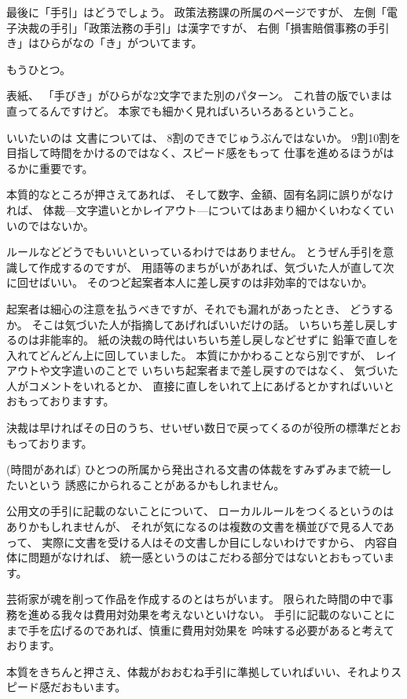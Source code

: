 \documentclass[uplatex,jis2004,dvipdfmx,12pt]{jsarticle}
\begin{document}
最後に「手引」はどうでしょう。
政策法務課の所属のページですが、
左側「電子決裁の手引」「政策法務の手引」は漢字ですが、
右側「損害賠償事務の手引き」はひらがなの「き」がついてます。


もうひとつ。

表紙、
「手びき」がひらがな2文字でまた別のパターン。
これ昔の版でいまは直ってるんですけど。
本家でも細かく見ればいろいろあるということ。

いいたいのは
文書については、
8割のできでじゅうぶんではないか。
9割10割を目指して時間をかけるのではなく、スピード感をもって
仕事を進めるほうがはるかに重要です。

本質的なところが押さえてあれば、
そして数字、金額、固有名詞に誤りがなければ、
体裁---文字遣いとかレイアウト---についてはあまり細かくいわなくていいのではないか。


ルールなどどうでもいいといっているわけではありません。
とうぜん手引を意識して作成するのですが、
用語等のまちがいがあれば、気づいた人が直して次に回せばいい。
そのつど起案者本人に差し戻すのは非効率的ではないか。

起案者は細心の注意を払うべきですが、それでも漏れがあったとき、
どうするか。
そこは気づいた人が指摘してあげればいいだけの話。
いちいち差し戻しするのは非能率的。
紙の決裁の時代はいちいち差し戻しなどせずに
鉛筆で直しを入れてどんどん上に回していました。
本質にかかわることなら別ですが、
レイアウトや文字遣いのことで
いちいち起案者まで差し戻すのではなく、
気づいた人がコメントをいれるとか、
直接に直しをいれて上にあげるとかすればいいとおもっておりますす。

決裁は早ければその日のうち、せいぜい数日で戻ってくるのが役所の標準だとお
もっております。

(時間があれば)
ひとつの所属から発出される文書の体裁をすみずみまで統一したいという
誘惑にかられることがあるかもしれません。

公用文の手引に記載のないことについて、
ローカルルールをつくるというのはありかもしれませんが、
それが気になるのは複数の文書を横並びで見る人であって、
実際に文書を受ける人はその文書しか目にしないわけですから、
内容自体に問題がなければ、
統一感というのはこだわる部分ではないとおもっています。

芸術家が魂を削って作品を作成するのとはちがいます。
限られた時間の中で事務を進める我々は費用対効果を考えないといけない。
手引に記載のないことにまで手を広げるのであれば、慎重に費用対効果を
吟味する必要があると考えております。


本質をきちんと押さえ、体裁がおおむね手引に準拠していればいい、それよりス
ピード感だおもいます。
\end{document}
